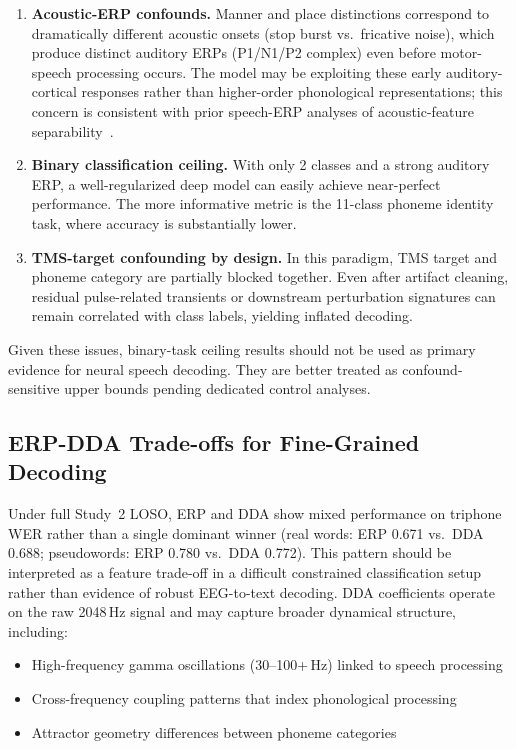 \documentclass[11pt,a4paper]{article}
\begin{document}
\begin{enumerate}
  \item \textbf{Acoustic-ERP confounds.} Manner and place distinctions
    correspond to dramatically different acoustic onsets (stop burst
    vs.\ fricative noise), which produce distinct auditory ERPs (P1/N1/P2
    complex) even before motor-speech processing occurs. The model may be
    exploiting these early auditory-cortical responses rather than higher-order
    phonological representations; this concern is consistent with prior
    speech-ERP analyses of acoustic-feature
    separability~\cite{toscano2010}.
  \item \textbf{Binary classification ceiling.} With only 2 classes and a
    strong auditory ERP, a well-regularized deep model can easily achieve
    near-perfect performance. The more informative metric is the 11-class
    phoneme identity task, where accuracy is substantially lower.
  \item \textbf{TMS-target confounding by design.} In this paradigm, TMS
    target and phoneme category are partially blocked together. Even after
    artifact cleaning, residual pulse-related transients or downstream
    perturbation signatures can remain correlated with class labels, yielding
    inflated decoding.
\end{enumerate}

Given these issues, binary-task ceiling results should not be used as primary
evidence for neural speech decoding. They are better treated as
confound-sensitive upper bounds pending dedicated control analyses.

\subsection{ERP-DDA Trade-offs for Fine-Grained Decoding}

Under full Study~2 LOSO, ERP and DDA show mixed performance on triphone WER
rather than a single dominant winner (real words: ERP 0.671 vs.\ DDA 0.688;
pseudowords: ERP 0.780 vs.\ DDA 0.772). This pattern should be interpreted as
a feature trade-off in a difficult constrained classification setup rather than
evidence of robust EEG-to-text decoding. DDA coefficients operate on the raw
2048\,Hz signal and may capture broader dynamical structure, including:

\begin{itemize}
  \item High-frequency gamma oscillations (30--100+\,Hz) linked to speech
    processing
  \item Cross-frequency coupling patterns that index phonological processing
  \item Attractor geometry differences between phoneme categories
\end{itemize}
\end{document}
